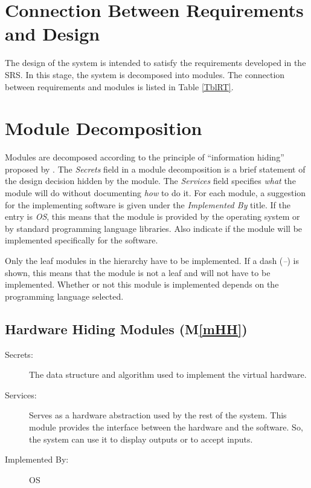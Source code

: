 \documentclass[12pt, titlepage]{article}
\newcommand{\mref}[1]{M\ref{#1}}
\begin{document}
	\section{Connection Between Requirements and Design} \label{SecConnection}
	
	The design of the system is intended to satisfy the requirements developed in
	the SRS. In this stage, the system is decomposed into modules. The connection
	between requirements and modules is listed in Table \ref{TblRT}.
	
	\section{Module Decomposition} \label{SecMD}
	
	Modules are decomposed according to the principle of ``information hiding''
	proposed by \citet{ParnasEtAl1984}. The \emph{Secrets} field in a module
	decomposition is a brief statement of the design decision hidden by the
	module. The \emph{Services} field specifies \emph{what} the module will do
	without documenting \emph{how} to do it. For each module, a suggestion for the
	implementing software is given under the \emph{Implemented By} title. If the
	entry is \emph{OS}, this means that the module is provided by the operating
	system or by standard programming language libraries.  Also indicate if the
	module will be implemented specifically for the software.
	
	Only the leaf modules in the
	hierarchy have to be implemented. If a dash (\emph{--}) is shown, this means
	that the module is not a leaf and will not have to be implemented. Whether or
	not this module is implemented depends on the programming language
	selected.
	
	\subsection{Hardware Hiding Modules (\mref{mHH})}
	
	\begin{description}
		\item[Secrets:]The data structure and algorithm used to implement the virtual
		hardware.
		\item[Services:]Serves as a hardware abstraction used by the rest of the
		system. This module provides the interface between the hardware and the
		software. So, the system can use it to display outputs or to accept inputs.
		\item[Implemented By:] OS
	\end{description}
	
\end{document}
